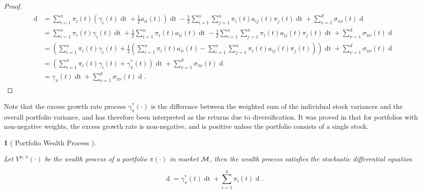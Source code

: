 \documentclass[british]{amsart} \usepackage{lmodern}
\numberwithin{equation}{section} \numberwithin{figure}{section}
\theoremstyle{plain} \newtheorem{thm}{\protect\theoremname}[section]
\theoremstyle{definition} \newtheorem{defn}[thm]{\protect\definitionname}
\theoremstyle{plain} \newtheorem{assumption}[thm]{\protect\assumptionname}
\theoremstyle{plain} \newtheorem{lem}[thm]{\protect\lemmaname}
\theoremstyle{plain} \newtheorem{prop}[thm]{\protect\propositionname}
\theoremstyle{remark} \newtheorem{rem}[thm]{\protect\remarkname}
\theoremstyle{plain} \newtheorem{cor}[thm]{\protect\corollaryname}
\renewcommand{\d}[1]{\mathop{\mathrm{d}{#1}}}
\newcommand{\V}{V^{w,\pi}}
\begin{document}
\begin{proof}
  \begin{gather*}
    \begin{split}
      \d{\log{\V(t)}} 
        & =
            \sum_{i=1}^{n} \pi_{i}(t) \left( 
                \gamma_{i}(t)\d{t} + \frac{1}{2}a_{ii}(t) 
            \right)\d{t}
          - \frac{1}{2} \sum_{i=1}^{n} \sum_{j=1}^{n} \pi_{i}(t)a_{ij}(t)\pi_{j}(t)\d{t}
          + \sum_{\nu=1}^{d} \sigma_{\pi\nu}(t) \d{W_{\nu}(t)} \\
        & =
            \sum_{i=1}^{n} \pi_{i}(t)\gamma_{i}(t)\d{t} +
                \frac{1}{2} \sum_{i=1}^{n} \pi_{i}(t)a_{ii}(t) \d{t}
                - \frac{1}{2} \sum_{i=1}^{n} \sum_{j=1}^{n} \pi_{i}(t)a_{ij}(t)\pi_{j}(t)\d{t}
          + \sum_{\nu=1}^{d} \sigma_{\pi\nu}(t) \d{W_{\nu}(t)} \\
         & =
          \left(
            \sum_{i=1}^{n} \pi_{i}(t)\gamma_{i}(t) +
            \frac{1}{2}
              \left(
                \sum_{i=1}^{n} \pi_{i}(t)a_{ii}(t) -
                \sum_{i=1}^{n} \sum_{j=1}^{n} \pi_{i}(t)a_{ij}(t)\pi_{j}(t)
              \right) 
          \right)\d{t} +
          \sum_{\nu=1}^{d} \sigma_{\pi\nu}(t) \d{W_{\nu}(t)} \\
         & =
          \left(
            \sum_{i=1}^{n} \pi_{i}(t)\gamma_{i}(t) +
            \gamma_{\pi}^{*}(t)
          \right)\d{t} +
          \sum_{\nu=1}^{d} \sigma_{\pi\nu}(t) \d{W_{\nu}(t)} \\
         &=
          \gamma_{\pi}(t) \d{t} +
          \sum_{\nu=1}^{d} \sigma_{\pi\nu}(t) \d{W_{\nu}(t)}.
   \end{split}
  \end{gather*}

\end{proof}

Note that the excess growth rate process $\gamma_{\pi}^{*}(\cdot)$ is the
difference between the weighted sum of the individual stock variances and the
overall portfolio variance, and has therefore been interpreted as the returns due
to diversification. It was proved in \cite{fernholz1999diversity} that for
portfolios with non-negative weights, the excess growth rate is non-negative,
and is positive unless the portfolio consists of a single stock.

\begin{prop} 
  [
    {\cite[Equation 1.15]{fernholz2009}}
    Portfolio Wealth Process
  ]
  \label{prop:dlogV}

  Let $\V(\cdot)$ be the wealth process of a portfolio $\pi(\cdot)$ in market
  $\mathcal{M}$, then the wealth process satisfies the stochastic differential equation

  \begin{equation}
      \d{\log \V(t)} = \gamma_{\pi}^{*}(t)\d{t} + \sum_{i=1}^{n} \pi_{i}(t) \d{\log{X_{i}(t)}}.
  \end{equation}

\end{prop}
\end{document}
